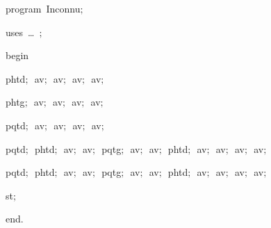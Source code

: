 
{
\parindent {}
\medskip

\carrenoir
\vspace{\neglskip}\mbox{\blc  \idt  \mcl program\idt \ Inconnu$;$
}\par 
\vspace{\neglskip}\mbox{\blc \blk\idt \mcl uses\idt \ \ldots\ $;$
}\par 
\vspace{\neglskip}\mbox{\blc  \idt  \mcl begin\idt }\par 
\vspace{\neglskip}\mbox{\blc  \blk\idt  phtd$;$\ av$;$\ av$;$\ av$;$\ av$;$\ }\par 
\vspace{\neglskip}\mbox{\blc  \blk\idt  phtg$;$\ av$;$\ av$;$\ av$;$\ av$;$\ }\par 
\vspace{\neglskip}\mbox{\blc  \blk\idt  pqtd$;$\ av$;$\ av$;$\ av$;$\ av$;$\ }\par 
\vspace{\neglskip}\mbox{\blc  \blk\idt  pqtd$;$\ phtd$;$\ av$;$\ av$;$\ pqtg$;$\ av$;$\ av$;$\ phtd$;$\ av$;$\ av$;$\ av$;$\ av$;$\ }\par 
\vspace{\neglskip}\mbox{\blc  \blk\idt  pqtd$;$\ phtd$;$\ av$;$\ av$;$\ pqtg$;$\ av$;$\ av$;$\ phtd$;$\ av$;$\ av$;$\ av$;$\ av$;$\ }\par 
\vspace{\neglskip}\mbox{\blc  \blk\idt  st$;$}\par 
\vspace{\neglskip}\mbox{\blc  \idt  \mcl end\idt $.$}\par 

\medskip }

